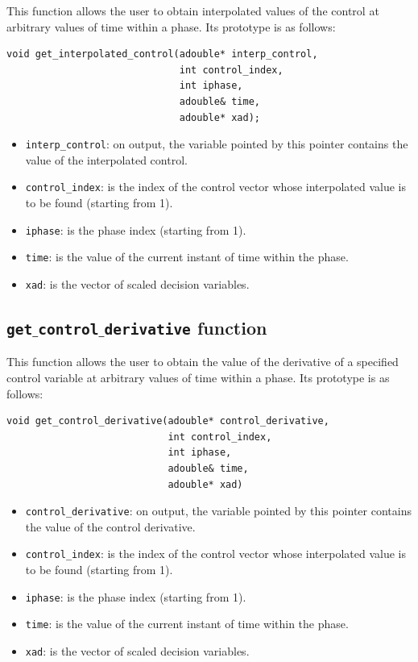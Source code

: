 \documentclass[a4paper,11pt]{report}    %
\begin{document}
This function allows the user to obtain interpolated values of the control
at arbitrary values of time within a phase. Its prototype is as follows:

\begin{verbatim}
void get_interpolated_control(adouble* interp_control, 
                              int control_index, 
                              int iphase, 
                              adouble& time, 
                              adouble* xad);
\end{verbatim}

\begin{itemize}
 \item \verb|interp_control|: on output, the variable pointed by this pointer contains the value of the interpolated control.
 \item \verb|control_index|:    is the index of the control vector whose interpolated value is to be found (starting from 1).
 \item \verb|iphase|:  is the phase index (starting from 1).
 \item \verb|time|:  is the value of the current instant of time within the phase.
 \item \verb|xad|: is the vector of scaled decision variables.
\end{itemize}



\subsection{ \texttt{get$\_$control$\_$derivative} function}

This function allows the user to obtain the value of the derivative of a specified control
variable at arbitrary values of time within a phase. Its prototype is as follows:

\begin{verbatim}
void get_control_derivative(adouble* control_derivative, 
                            int control_index, 
                            int iphase, 
                            adouble& time, 
                            adouble* xad)
\end{verbatim}

\begin{itemize}
 \item \verb|control_derivative|: on output, the variable pointed by this pointer contains the value of the control derivative.
 \item \verb|control_index|:    is the index of the control vector whose interpolated value is to be found (starting from 1).
 \item \verb|iphase|:  is the phase index (starting from 1).
 \item \verb|time|:  is the value of the current instant of time within the phase.
 \item \verb|xad|: is the vector of scaled decision variables.
\end{itemize}
\end{document}
